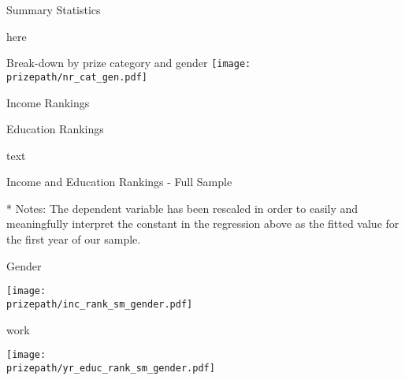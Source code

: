 \begin{frame}{Summary Statistics}
\item here
\end{frame}

\begin{frame}{Break-down by prize category and gender}
    \texttt{[image: \\prizepath/nr\_cat\_gen.pdf]}  
\end{frame}

\begin{frame}{Income Rankings}
\end{frame}


\begin{frame}{Education Rankings}

 text 
\end{frame}

\begin{frame}{Income and Education Rankings - Full Sample}


\begin{table}[hp]
\begin{center}
 \caption{Rankings over time}
\scalebox{0.9}{}
\end{center}
\begin{tablenotes}\footnotesize
\item[*] Notes: The dependent variable has been rescaled in order to easily and meaningfully interpret the constant in the regression above as the fitted value for the first year of our sample.
\end{tablenotes}
\end{table}

\end{frame}


\begin{frame}{Gender}

  \texttt{[image: \\prizepath/inc\_rank\_sm\_gender.pdf]}

\end{frame}

\begin{frame}{work}

  \texttt{[image: \\prizepath/yr\_educ\_rank\_sm\_gender.pdf]}

\end{frame}


